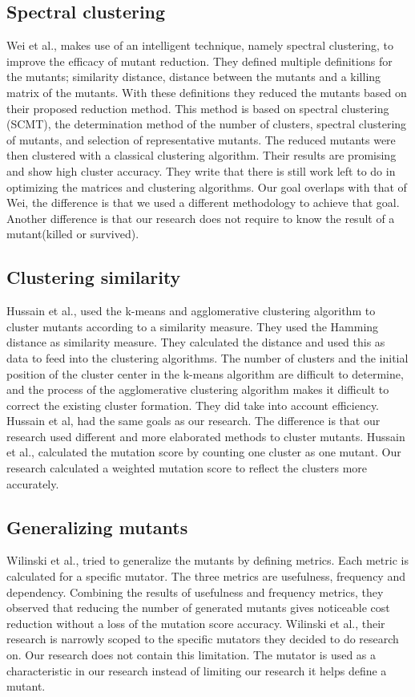 \documentclass[conference,draftclsnofoot,onecolumn]{IEEEtran}
\begin{document}
\subsection{Spectral clustering}
Wei et al., makes use of an intelligent technique, namely spectral clustering, to improve the efficacy of mutant reduction\cite{Wei2021SpectralTesting}.
They defined multiple definitions for the mutants; similarity distance, distance between the mutants and a killing matrix of the mutants.
With these definitions they reduced the mutants based on their proposed reduction method.
This method is based on spectral clustering (SCMT), the determination method of the number of clusters, spectral clustering of mutants, and selection of representative mutants.
The reduced mutants were then clustered with a classical clustering algorithm.
Their results are promising and show high cluster accuracy.
They write that there is still work left to do in optimizing the matrices and clustering algorithms.
Our goal overlaps with that of Wei, the difference is that we used a different methodology to achieve that goal.
Another difference is that our research does not require to know the result of a mutant(killed or survived).

\subsection{Clustering similarity}
Hussain et al., used the k-means and agglomerative clustering algorithm to cluster mutants according to a similarity measure. 
They used the Hamming distance as similarity measure.
They calculated the distance and used this as data to feed into the clustering algorithms.
The number of clusters and the initial position of the cluster center in the k-means algorithm are difficult to determine, and the process of the agglomerative clustering algorithm makes it difficult to correct the existing cluster formation\cite{Hussain2008}.
They did take into account efficiency.
Hussain et al, had the same goals as our research. 
The difference is that our research used different and more elaborated methods to cluster mutants.
Hussain et al., calculated the mutation score by counting one cluster as one mutant.
Our research calculated a weighted mutation score to reflect the clusters more accurately.

\subsection{Generalizing mutants}
Wilinski et al., tried to generalize the mutants by defining metrics.
Each metric is calculated for a specific mutator.
The three metrics are usefulness, frequency and dependency.
Combining the results of usefulness and frequency metrics, they observed that reducing the number of generated mutants gives noticeable cost reduction without a loss of the mutation score accuracy.
Wilinski et al., their research is narrowly scoped to the specific mutators they decided to do research on.
Our research does not contain this limitation.
The mutator is used as a characteristic in our research instead of limiting our research it helps define a mutant.
\end{document}
